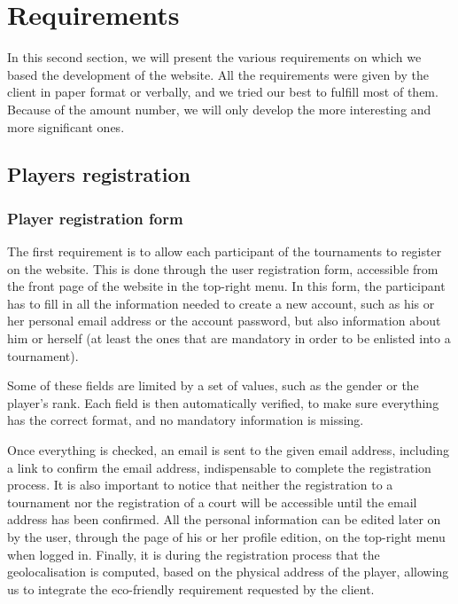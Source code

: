 \section{Requirements}
\label{sec:Requirements}


In this second section, we will present the various requirements on which we
based the development of the website. All the requirements were given by the
client in paper format or verbally, and we tried our best to fulfill most of
them. Because of the amount number, we will only develop the more interesting
and more significant ones.

\subsection{Players registration}
\label{sub:Players registration}

\subsubsection{Player registration form}
\label{subs:Registration form}


The first requirement is to allow each participant of the tournaments to
register on the website. This is done through the user registration form,
accessible from the front page of the website in the top-right menu.
In this form, the participant has to fill in all the information needed to
create a new account, such as his or her personal email address or the account
password, but also information about him or herself (at least the ones that
are mandatory in order to be enlisted into a tournament).\newline

Some of these fields are limited by a set of values, such as the gender or the
player's rank. Each field is then automatically verified, to make sure
everything has the correct format, and no mandatory information is missing.\newline

Once everything is checked, an email is sent to the given email address,
including a link to confirm the email address, indispensable to complete
the registration process. It is also important to notice that neither the
registration to a tournament nor the registration of a court will be accessible
until the email address has been confirmed. All the personal information can
be edited later on by the user, through the page of his or her profile edition,
on the top-right menu when logged in. Finally, it is during the registration
process that the geolocalisation is computed, based on the physical address
of the player, allowing us to integrate the eco-friendly requirement requested
by the client. \newline

